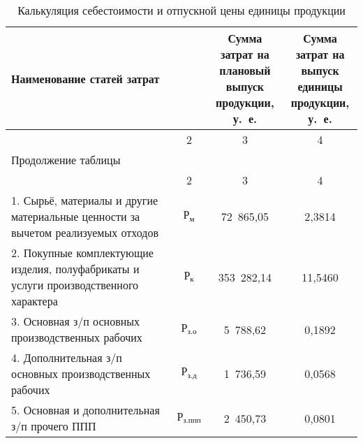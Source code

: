 {\small
\begin{longtable}{| m{10.3cm} | c | c | c |}
  \caption{
    Калькуляция себестоимости и отпускной цены единицы продукции
  }\label{tbl:calculation} \\
      \hline
      \centering Наименование статей затрат
      & \rotatebox[origin=c]{90}{\parbox{3.5cm}{Условное обозначение}}
      & \rotatebox[origin=c]{90}{
        \parbox{4.0cm}{
          Сумма затрат на \\ плановый выпуск \\ продукции, у.~е.
        }
      }
      & \rotatebox[origin=c]{90}{
        \parbox{3.5cm}{
          Сумма затрат на \\ выпуск единицы \\ продукции, у.~е.
        }
      } \\

      \hline
      \centering 1 & 2 & 3 & 4 \\
      \hline
      \endfirsthead

      \multicolumn{4}{l}{\normalsize Продолжение таблицы \thetable{}} \\
      \hline
      \centering 1 & 2 & 3 & 4 \\
      \hline
      \endhead

      1. Сырьё, материалы и другие материальные ценности \newline
      за вычетом реализуемых отходов
      & \( \text{Р}_{\text{м}} \) & 72~865,05 & 2,3814 \\
      \hline

      2. Покупные комплектующие изделия, полуфабрикаты и \newline
      услуги производственного характера
      & \( \text{Р}_{\text{к}} \) & 353~282,14 & 11,5460 \\
      \hline

      3. Основная з/п основных производственных рабочих
      & \( \text{Р}_{\text{з.о}} \) & 5~788,62 & 0,1892 \\
      \hline

      4. Дополнительная з/п основных производственных \newline рабочих
      & \( \text{Р}_{\text{з.д}} \) & 1~736,59 & 0,0568 \\
      \hline

      5. Основная и дополнительная з/п прочего ППП
      & \( \text{Р}_{\text{з.ппп}} \) & 2~450{,}73 & 0,0801 \\
      \hline


\end{longtable}}
